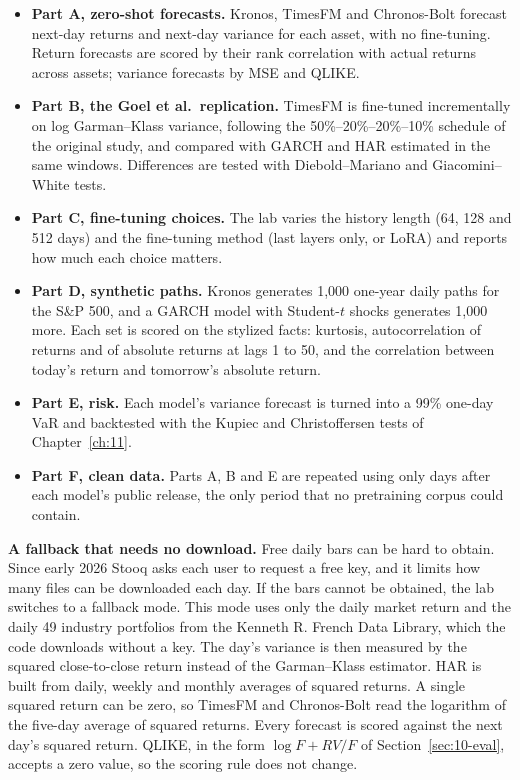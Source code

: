 \begin{itemize}
  \item \textbf{Part A, zero-shot forecasts.} Kronos, TimesFM and Chronos-Bolt forecast next-day returns and next-day variance for each asset, with no fine-tuning. Return forecasts are scored by their rank correlation with actual returns across assets; variance forecasts by MSE and QLIKE.
  \item \textbf{Part B, the Goel et al.\ replication.} TimesFM is fine-tuned incrementally on log Garman--Klass variance, following the 50\%--20\%--20\%--10\% schedule of the original study, and compared with GARCH and HAR estimated in the same windows. Differences are tested with Diebold--Mariano and Giacomini--White tests.
  \item \textbf{Part C, fine-tuning choices.} The lab varies the history length (64, 128 and 512 days) and the fine-tuning method (last layers only, or LoRA) and reports how much each choice matters.
  \item \textbf{Part D, synthetic paths.} Kronos generates 1,000 one-year daily paths for the S\&P 500, and a GARCH model with Student-$t$ shocks generates 1,000 more. Each set is scored on the stylized facts: kurtosis, autocorrelation of returns and of absolute returns at lags 1 to 50, and the correlation between today's return and tomorrow's absolute return.
  \item \textbf{Part E, risk.} Each model's variance forecast is turned into a 99\% one-day VaR and backtested with the Kupiec and Christoffersen tests of Chapter~\ref{ch:11}.
  \item \textbf{Part F, clean data.} Parts A, B and E are repeated using only days after each model's public release, the only period that no pretraining corpus could contain.
\end{itemize}

\textbf{A fallback that needs no download.} Free daily bars can be hard to obtain. Since early 2026 Stooq asks each user to request a free key, and it limits how many files can be downloaded each day. If the bars cannot be obtained, the lab switches to a fallback mode. This mode uses only the daily market return and the daily 49 industry portfolios from the Kenneth R. French Data Library, which the code downloads without a key. The day's variance is then measured by the squared close-to-close return instead of the Garman--Klass estimator. HAR is built from daily, weekly and monthly averages of squared returns. A single squared return can be zero, so TimesFM and Chronos-Bolt read the logarithm of the five-day average of squared returns. Every forecast is scored against the next day's squared return. QLIKE, in the form $\log F + RV/F$ of Section~\ref{sec:10-eval}, accepts a zero value, so the scoring rule does not change.

